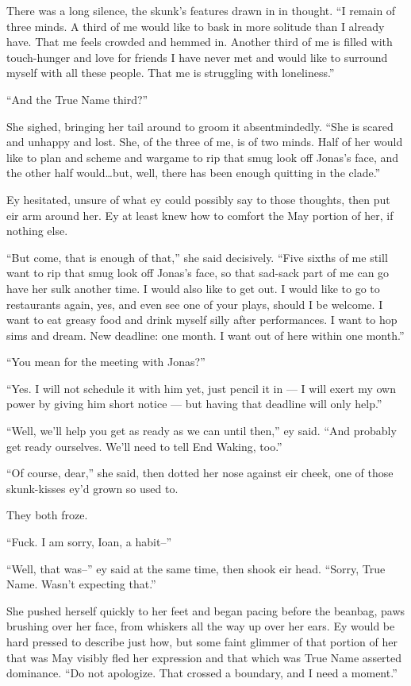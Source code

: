There was a long silence, the skunk's features drawn in in thought. ``I remain of three minds. A third of me would like to bask in more solitude than I already have. That me feels crowded and hemmed in. Another third of me is filled with touch-hunger and love for friends I have never met and would like to surround myself with all these people. That me is struggling with loneliness.''

``And the True Name third?''

She sighed, bringing her tail around to groom it absentmindedly. ``She is scared and unhappy and lost. She, of the three of me, is of two minds. Half of her would like to plan and scheme and wargame to rip that smug look off Jonas's face, and the other half would\ldots but, well, there has been enough quitting in the clade.''

Ey hesitated, unsure of what ey could possibly say to those thoughts, then put eir arm around her. Ey at least knew how to comfort the May portion of her, if nothing else.

``But come, that is enough of that,'' she said decisively. ``Five sixths of me still want to rip that smug look off Jonas's face, so that sad-sack part of me can go have her sulk another time. I would also like to get out. I would like to go to restaurants again, yes, and even see one of your plays, should I be welcome. I want to eat greasy food and drink myself silly after performances. I want to hop sims and dream. New deadline: one month. I want out of here within one month.''

``You mean for the meeting with Jonas?''

``Yes. I will not schedule it with him yet, just pencil it in — I will exert my own power by giving him short notice — but having that deadline will only help.''

``Well, we'll help you get as ready as we can until then,'' ey said. ``And probably get ready ourselves. We'll need to tell End Waking, too.''

``Of course, dear,'' she said, then dotted her nose against eir cheek, one of those skunk-kisses ey'd grown so used to.

They both froze.

``Fuck. I am sorry, Ioan, a habit--''

``Well, that was--'' ey said at the same time, then shook eir head. ``Sorry, True Name. Wasn't expecting that.''

She pushed herself quickly to her feet and began pacing before the beanbag, paws brushing over her face, from whiskers all the way up over her ears. Ey would be hard pressed to describe just how, but some faint glimmer of that portion of her that was May visibly fled her expression and that which was True Name asserted dominance. ``Do not apologize. That crossed a boundary, and I need a moment.''

